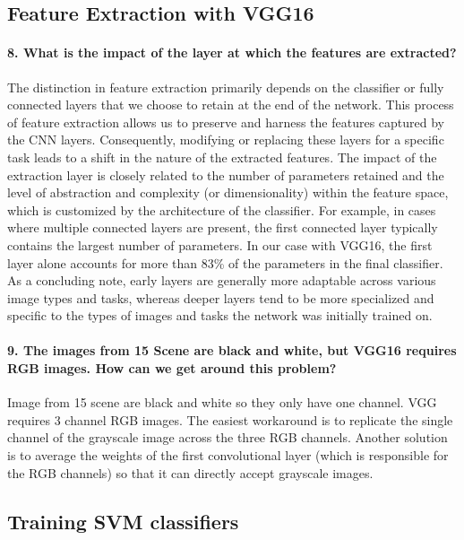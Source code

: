 \subsection{Feature Extraction with VGG16}
\paragraph{8. What is the impact of the layer at which the features are extracted?}
The distinction in feature extraction primarily depends on the classifier or fully connected layers that we choose to retain at the end of the network. This process of feature extraction allows us to preserve and harness the features captured by the CNN layers. Consequently, modifying or replacing these layers for a specific task leads to a shift in the nature of the extracted features. The impact of the extraction layer is closely related to the number of parameters retained and the level of abstraction and complexity (or dimensionality) within the feature space, which is customized by the architecture of the classifier. For example, in cases where multiple connected layers are present, the first connected layer typically contains the largest number of parameters. In our case with VGG16, the first layer alone accounts for more than 83\% of the parameters in the final classifier. As a concluding note, early layers are generally more adaptable across various image types and tasks, whereas deeper layers tend to be more specialized and specific to the types of images and tasks the network was initially trained on.

\paragraph{9. The images from 15 Scene are black and white, but VGG16 requires RGB images. How can we get around this problem?}
Image from 15 scene are black and white so they only have one channel. VGG requires 3 channel RGB images. The easiest workaround is to replicate the single channel of the grayscale image across the three RGB channels. Another solution is to average the weights of the first convolutional layer (which is responsible for the RGB channels) so that it can directly accept grayscale images.

\subsection{Training SVM classifiers}
